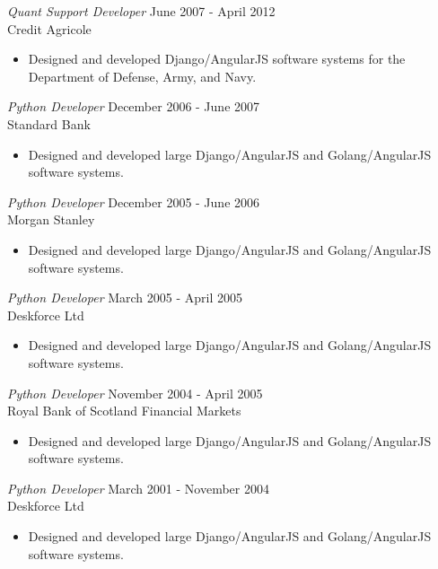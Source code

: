 \documentclass[margin, 10pt]{res} %
\begin{document}
\begin{resume}
        {\sl Quant Support Developer} \hfill June 2007 - April 2012 \\
        Credit Agricole
        \begin{itemize} \itemsep -2pt %
        \item Designed and developed Django/AngularJS software systems for the Department of Defense, Army, and Navy.
        \end{itemize}

        {\sl Python Developer} \hfill December 2006 - June 2007\\
        Standard Bank
        \begin{itemize}
            \item Designed and developed large Django/AngularJS and Golang/AngularJS software systems.
        \end{itemize}

        {\sl Python Developer} \hfill December 2005 - June 2006\\
        Morgan Stanley
        \begin{itemize}
            \item Designed and developed large Django/AngularJS and Golang/AngularJS software systems.
        \end{itemize}

        {\sl Python Developer} \hfill March 2005 - April 2005\\
        Deskforce Ltd
        \begin{itemize}
            \item Designed and developed large Django/AngularJS and Golang/AngularJS software systems.
        \end{itemize}

        {\sl Python Developer} \hfill November 2004 - April 2005\\
        Royal Bank of Scotland Financial Markets
        \begin{itemize}
            \item Designed and developed large Django/AngularJS and Golang/AngularJS software systems.
        \end{itemize}

        {\sl Python Developer} \hfill March 2001 - November 2004\\
        Deskforce Ltd
        \begin{itemize}
            \item Designed and developed large Django/AngularJS and Golang/AngularJS software systems.
        \end{itemize}


\end{resume}
\end{document}
